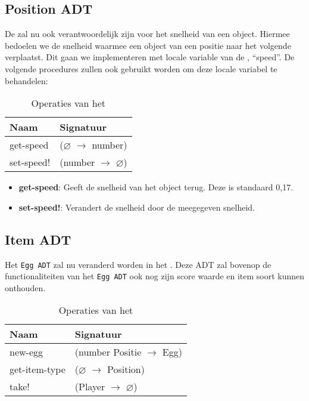 \subsection{Position ADT}
\label{section:positie}
De \texttt{} zal nu ook verantwoordelijk zijn voor het snelheid van een object.
Hiermee bedoelen we de snelheid waarmee een object van een positie naar het volgende verplaatst.
Dit gaan we implementeren met locale variable van de \texttt{}, ``speed''.
De volgende procedures zullen ook gebruikt worden om deze locale variabel te behandelen:


\begin{table}[hbt]
\centering
\begin{tabular}{|ll|}
\hline
\rowcolor[HTML]{000000} 
{\color[HTML]{FFFFFF} \textbf{Naam}} & {\color[HTML]{FFFFFF} \textbf{Signatuur}} \\ \hline
get-speed        & ($\varnothing$ $\rightarrow$ number)                        \\ \hline
set-speed!        & (number $\rightarrow$ $\varnothing$)                        \\ \hline
\end{tabular}
\caption{Operaties van het \texttt{}}
\label{table:positie}
\end{table}

\begin{itemize}
	\item \textbf{get-speed}: Geeft de snelheid van het object terug.
		Deze is standaard 0,17.
	\item \textbf{set-speed!}: Verandert de snelheid door de meegegeven snelheid.
\end{itemize}

\subsection{Item ADT}
\label{section:item}
Het \texttt{Egg ADT} zal nu veranderd worden in het \texttt{}.
Deze ADT zal bovenop de functionaliteiten van het \texttt{Egg ADT} ook nog zijn score waarde en item soort kunnen onthouden.

\begin{table}[hbt]
\centering
\begin{tabular}{|ll|}
\hline
\rowcolor[HTML]{000000} 
{\color[HTML]{FFFFFF} \textbf{Naam}} & {\color[HTML]{FFFFFF} \textbf{Signatuur}} \\ \hline
new-egg                              & (number Positie $\rightarrow$ Egg) \\ \hline
get-item-type         & ($\varnothing$ $\rightarrow$ Position)                        \\ \hline
take!                              & (Player $\rightarrow$ $\varnothing$)                   \\ \hline
\end{tabular}
\caption{Operaties van het \texttt{}}
\label{table:item}
\end{table}

